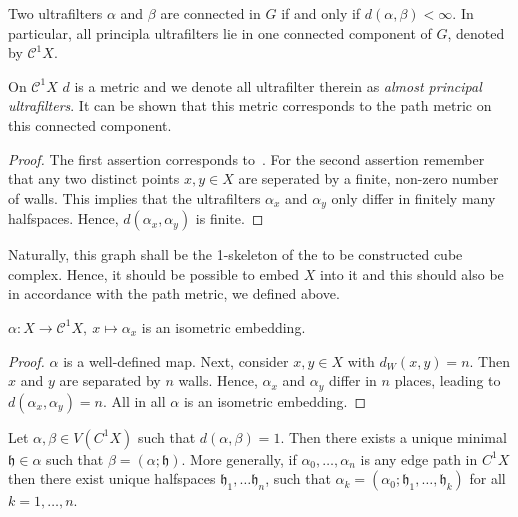 \begin{lemma}
Two ultrafilters \(\alpha\) and \(\beta\) are connected in \(G\) if and only if \(d(\alpha, \beta) < \infty\). In particular, all principla ultrafilters lie in one connected component of \(G\), denoted by \(\mathcal{C}^1X\). 
\end{lemma}

\begin{rem}
  On \(\mathcal{C}^1X\) \(d\) is a metric and we denote all ultrafilter therein as \emph{almost principal ultrafilters}. It can be shown that this metric corresponds to the path metric on this connected component.
\end{rem}

\begin{proof}
  The first assertion corresponds to~\cite[Lemma 4.4]{Nica2004}. For the second assertion remember that any two distinct points \(x,y \in X\) are seperated by a finite, non-zero number of walls. This implies that the ultrafilters \(\alpha_x\) and \(\alpha_y\) only differ in finitely many halfspaces. Hence, \(d(\alpha_x, \alpha_y)\) is finite.
\end{proof}

Naturally, this graph shall be the 1-skeleton of the to be constructed cube complex. Hence, it should be possible to embed \(X\) into it and this should also be in accordance with the path metric, we defined above.

\begin{prop}
  \(\alpha\colon X \to \mathcal{C}^1X,\ x \mapsto \alpha_x\) is an isometric embedding.
\end{prop}

\begin{proof}
  \(\alpha\) is a well-defined map. Next, consider \(x,y \in X\) with \(d_W(x,y) = n\). Then \(x\) and \(y\) are separated by \(n\) walls. Hence, \(\alpha_x\) and \(\alpha_y\) differ in \(n\) places, leading to \(d(\alpha_x, \alpha_y) = n\). All in all \(\alpha\) is an isometric embedding.
\end{proof}

\begin{lemma}
  Let \(\alpha,\beta \in V(C^1X)\) such that \(d(\alpha, \beta) = 1\). Then there exists a unique minimal \(\mathfrak{h} \in \alpha\) such that \(\beta = (\alpha; \mathfrak{h})\). More generally, if \(\alpha_0, \dots, \alpha_n\) is any edge path in \(C^1X\) then there exist unique halfspaces \(\mathfrak{h}_1, \dots \mathfrak{h}_n\), such that \(\alpha_k = (\alpha_0; \mathfrak{h}_1, \dots, \mathfrak{h}_k)\) for all \(k = 1, \dots, n\).
\end{lemma}

